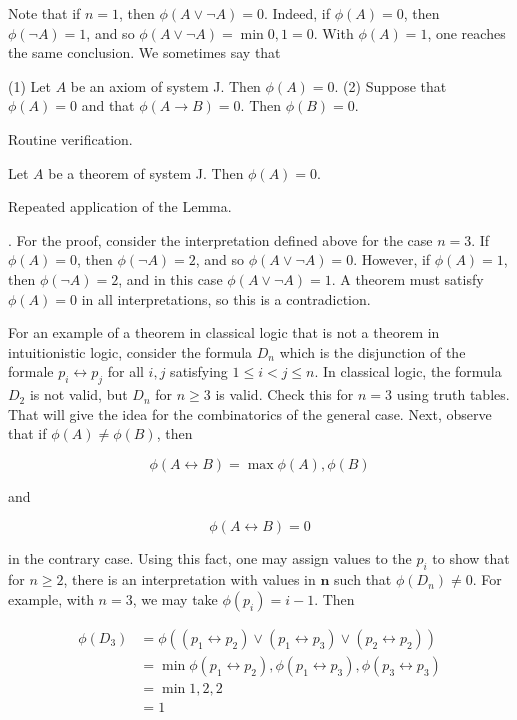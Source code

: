 Note that if $n = 1$, then $\phi(A \lor \neg A) = 0$.  Indeed, if $\phi(A) = 0$, then $\phi(\neg A) =1$, and so $\phi(A \lor \neg A) = \min 0, 1 = 0$.  With $\phi(A) = 1$, one reaches the same conclusion.  We sometimes say that 

\begin{lemma}
(1) Let $A$ be an axiom of system J. Then $\phi(A) = 0$. (2) Suppose that $\phi(A) = 0$ and that $\phi(A \to B) = 0$.  Then $\phi(B) = 0$.
\end{lemma}

  Routine verification.

\begin{theorem}
Let $A$ be a theorem of system J.  Then $\phi(A) = 0$.
\end{theorem}

  Repeated application of the Lemma. 



 . For the proof, consider the interpretation defined above for the case $n =3$.  If $\phi(A) = 0$, then $\phi(\neg A) = 2$, and so $\phi(A \lor \neg A) = 0$.  However, if $\phi(A) = 1$, then $\phi(\neg A) = 2$, and in this case  $\phi(A \lor \neg A) = 1$.  A theorem must satisfy $\phi(A) = 0$ in all interpretations, so this is a contradiction. 

For an example of a theorem in classical logic that is not a theorem in intuitionistic logic, consider the formula $D_n$ which is the disjunction of the formale $p_i \leftrightarrow p_j$ for all $i, j$ satisfying $1 \le i < j \le n$. In classical logic, the formula $D_2$ is not valid, but $D_n$ for $n \ge 3$ is valid.  Check this for $n = 3$ using truth tables. That will give the idea for the combinatorics of the general case. Next, observe that  if $\phi(A) \ne \phi(B)$,  then

$$
  \phi(A \leftrightarrow B) = \max \phi(A), \phi(B)
$$

and

$$
  \phi(A \leftrightarrow B) = 0
$$

in the contrary case.  Using this fact, one may assign values to the $p_i$ to show that for $n  \ge 2$, there is an interpretation with values in $\mathbf{n}$ such that  $\phi(D_n) \ne 0$.  For example, with $n = 3$, we may take $\phi(p_i) = i-1$.
Then

\begin{align}
\phi(D_3) &= \phi((p_1 \leftrightarrow p_2) \lor (p_1 \leftrightarrow p_3)\lor (p_2 \leftrightarrow p_2)) \\
  & = \min \phi(p_1 \leftrightarrow p_2), \phi(p_1 \leftrightarrow p_3), \phi(p_3 \leftrightarrow p_3) \\
  & = \min 1, 2, 2 \\
 & = 1 \\
\end{align}


